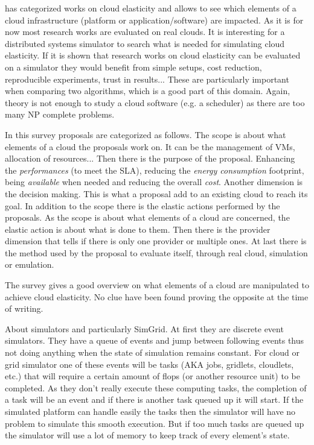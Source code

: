 \documentclass[a4paper, onecolumn, 11pt]{article}
\begin{document}
  
  \cite{Naskos2016} has categorized works on cloud elasticity and allows to see
  which elements of a cloud infrastructure (platform or application/software)
  are impacted. As it is for now most research works are evaluated on real
  clouds. It is interesting for a distributed systems simulator to search what
  is needed for simulating cloud elasticity. If it is shown that research works
  on cloud elasticity can be evaluated on a simulator they would benefit from
  simple setups, cost reduction, reproducible experiments, trust in results... 
  These are particularly important when comparing two algorithms, which is a
  good part of this domain. Again, theory is not enough to study a cloud
  software (e.g. a scheduler) as there are too many NP complete problems.
  
  In this survey proposals are categorized as follows. The scope is about what
  elements of a cloud the proposals work on. It can be the management of VMs,
  allocation of resources... Then there is the purpose of the proposal.
  Enhancing the \textit{performances} (to meet the SLA), reducing the
  \textit{energy consumption} footprint, being \textit{available} when needed
  and reducing the overall \textit{cost}. Another dimension is the decision
  making. This is what a proposal add to an existing cloud to reach its goal. In
  addition to the scope there is the elastic actions performed by the proposals.
  As the scope is about what elements of a cloud are concerned, the elastic
  action is about what is done to them. Then there is the provider dimension
  that tells if there is only one provider or multiple ones. At last there is
  the method used by the proposal to evaluate itself, through real cloud,
  simulation or emulation.
  
  The survey gives a good overview on what elements of a cloud are manipulated
  to achieve cloud elasticity. No clue have been found proving the opposite at
  the time of writing.
  
  About simulators and particularly SimGrid. At first they are discrete event 
  simulators. They have a queue of events and jump between following events 
  thus not doing anything when the state of simulation remains constant. For 
  cloud or grid simulator one of these events will be tasks (AKA jobs, 
  gridlets, cloudlets, etc.) that will require a certain amount of flops (or 
  another resource unit) to be completed. As they don't really execute these 
  computing tasks, the completion of a task will be an event and if there is 
  another task queued up it will start. If the simulated platform can handle 
  easily the tasks then the simulator will have no problem to simulate this 
  smooth execution. But if too much tasks are queued up the simulator will use 
  a lot of memory to keep track of every element's state.
  
\end{document}
